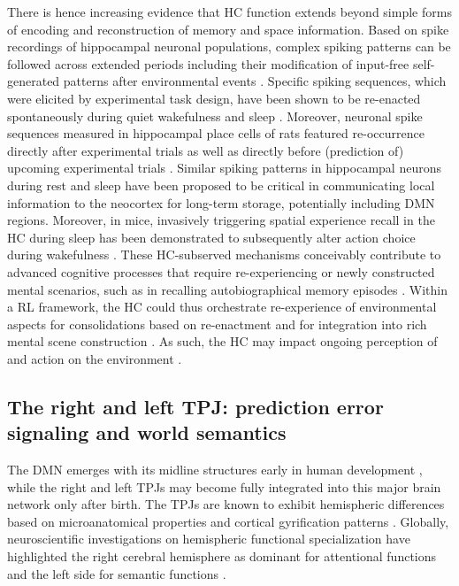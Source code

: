 \documentclass[10pt,letterpaper]{article}
\begin{document}
There is hence increasing evidence that
HC function extends beyond simple forms of
encoding and reconstruction of memory and space information.
Based on spike recordings of hippocampal neuronal populations,
complex spiking patterns can be followed across extended periods including
their modification of input-free self-generated patterns
after environmental events \citep{buzsaki2004large}.
Specific spiking sequences, which were elicited by experimental task design,
have been shown to be re-enacted spontaneously during
quiet wakefulness and sleep \citep{hartley2014space, o2010play}.
Moreover, neuronal spike sequences measured in hippocampal place cells of rats
featured re-occurrence directly after experimental trials
as well as directly before (prediction of) upcoming experimental trials \citep{diba2007forward}.
Similar spiking patterns in hippocampal neurons during rest and sleep
have been proposed to be critical in communicating local information
to the neocortex for long-term storage, potentially including DMN regions.
Moreover, in mice, invasively triggering spatial experience recall
in the HC during sleep
has been demonstrated to subsequently alter action choice during wakefulness
\citep{lavilleon2015}.
These HC-subserved mechanisms
conceivably contribute to advanced cognitive processes that require
re-experiencing or newly constructed mental scenarios,
such as in recalling autobiographical memory episodes
\citep{hassabis2007patients}.
Within a RL framework, the HC could thus orchestrate re-experience of environmental aspects for
consolidations based on re-enactment and for integration into
rich mental scene construction \citep{deuker2016event, bird2010establishing}.
As such, the HC may impact
ongoing perception of and action on the environment
\citep{maguire2016, lavilleon2015}.


\subsection{The right and left TPJ: prediction error signaling and world semantics}
The DMN emerges with its midline structures early in human development
\citep{doria2010}, while
the right and left TPJs may become fully integrated into this major brain
network only after birth.
The TPJs are known to exhibit hemispheric differences
based on microanatomical properties and cortical gyrification patterns
\citep{seghier2013angular}.
Globally, neuroscientific investigations on hemispheric functional specialization
have highlighted the right cerebral hemisphere as dominant for attentional functions
and the left side for semantic functions
\citep{seghier2013angular, bzdok2013tpj, bzdok2016left,
stephan2007mechanisms}.
\end{document}
